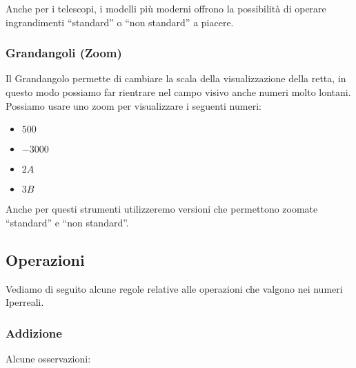 Anche per i telescopi, i modelli più moderni offrono la possibilità di operare 
ingrandimenti ``standard'' o ``non standard'' a piacere.

\subsubsection{Grandangoli (Zoom)}
\label{subsec:insnum_microscopio}

Il Grandangolo permette di cambiare la scala della visualizzazione della retta, 
in questo modo possiamo far rientrare nel campo visivo anche numeri molto 
lontani.
Possiamo usare uno zoom per visualizzare i seguenti numeri:

\begin{multicols}{4}
\begin{itemize}
 \item $500$
 \item $-3000$
 \item $2A$
 \item $3B$
\end{itemize}
\end{multicols}

Anche per questi strumenti utilizzeremo versioni che permettono zoomate 
``standard'' e ``non standard''.

\subsection{Operazioni}
\label{subsec:insnum_operazioni}

Vediamo di seguito alcune regole relative alle operazioni 
che valgono nei numeri Iperreali.

\subsubsection{Addizione}
\label{subsec:insnum_addizione}

Alcune osservazioni:

